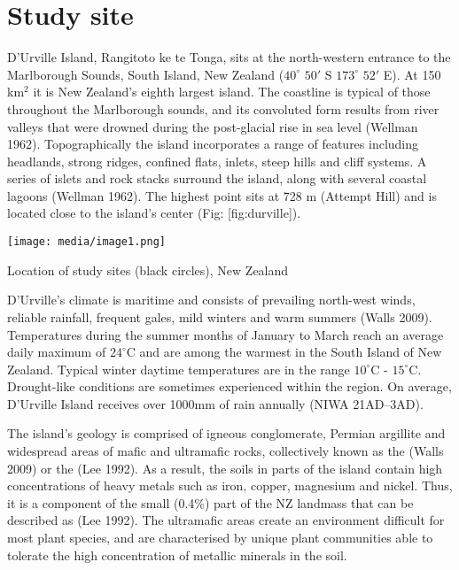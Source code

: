 \documentclass[]{article}
\begin{document}
\section{Study site}\label{study-site}

D'Urville Island, Rangitoto ke te Tonga, sits at the north-western entrance to the Marlborough Sounds, South Island, New Zealand (\(40^{\circ}\) \(50'\) S \(173^{\circ}\) \(52'\) E). At 150 km\({}^{2}\) it is New Zealand's eighth largest island. The coastline is typical of those throughout the Marlborough sounds, and its convoluted form results from river valleys that were drowned during the post-glacial rise in sea level (Wellman 1962). Topographically the island incorporates a range of features including headlands, strong ridges, confined flats, inlets, steep hills and cliff systems. A series of islets and rock stacks surround the island, along with several coastal lagoons (Wellman 1962). The highest point sits at 728 m (Attempt Hill) and is located close to the island's center (Fig: {[}fig:durville{]}).

\texttt{[image: media/image1.png]}

Location of study sites (black circles), New Zealand

D'Urville's climate is maritime and consists of prevailing north-west winds, reliable rainfall, frequent gales, mild winters and warm summers (Walls 2009). Temperatures during the summer months of January to March reach an average daily maximum of \(24^{\circ}\)C and are among the warmest in the South Island of New Zealand. Typical winter daytime temperatures are in the range \(10^{\circ}\)C - \(15^{\circ}\)C. Drought-like conditions are sometimes experienced within the region. On average, D'Urville Island receives over 1000mm of rain annually (NIWA 21AD--3AD).

The island's geology is comprised of igneous conglomerate, Permian argillite and widespread areas of mafic and ultramafic rocks, collectively known as the (Walls 2009) or the (Lee 1992). As a result, the soils in parts of the island contain high concentrations of heavy metals such as iron, copper, magnesium and nickel. Thus, it is a component of the small (0.4\%) part of the NZ landmass that can be described as (Lee 1992). The ultramafic areas create an environment difficult for most plant species, and are characterised by unique plant communities able to tolerate the high concentration of metallic minerals in the soil.
\end{document}
